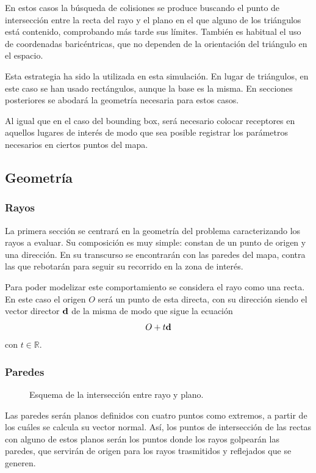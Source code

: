 En estos casos la búsqueda de colisiones se produce buscando el punto de intersección entre la recta del rayo y el plano en el que alguno de los triángulos está contenido, comprobando más tarde sus límites.
También es habitual el uso de coordenadas baricéntricas, que no dependen de la orientación del triángulo en el espacio. \cite{Graficos}

Esta estrategia ha sido la utilizada en esta simulación.
En lugar de triángulos, en este caso se han usado rectángulos, aunque la base es la misma.
En secciones posteriores se abodará la geometría necesaria para estos casos.

Al igual que en el caso del bounding box, será necesario colocar receptores en aquellos lugares de interés de modo que sea posible registrar los parámetros necesarios en ciertos puntos del mapa.


\subsection{Geometría}

\subsubsection{Rayos}
La primera sección se centrará en la geometría del problema caracterizando los rayos a evaluar.
Su composición es muy simple: constan de un punto de origen y una dirección.
En su transcurso se encontrarán con las paredes del mapa, contra las que rebotarán para seguir su recorrido en la zona de interés.

Para poder modelizar este comportamiento se considera el rayo como una recta.
En este caso el origen $O$ será un punto de esta directa, con su dirección siendo el vector director $\vb{d}$ de la misma de modo que sigue la ecuación
\begin{equation}
    O + t\vb{d}
\end{equation}
con $t\in \mathbb{R}$.

\subsubsection{Paredes}

\begin{figure}
    \centering
    \hspace*{0.5cm}
    \def\svgwidth{0.3\textwidth}
    
    \caption{Esquema de la intersección entre rayo y plano.}
    \label{fig:rayo_plano}
\end{figure}
Las paredes serán planos definidos con cuatro puntos como extremos, a partir de los cuáles se calcula su vector normal.
Así, los puntos de intersección de las rectas con alguno de estos planos serán los puntos donde los rayos golpearán las paredes, que servirán de origen para los rayos trasmitidos y reflejados que se generen.

